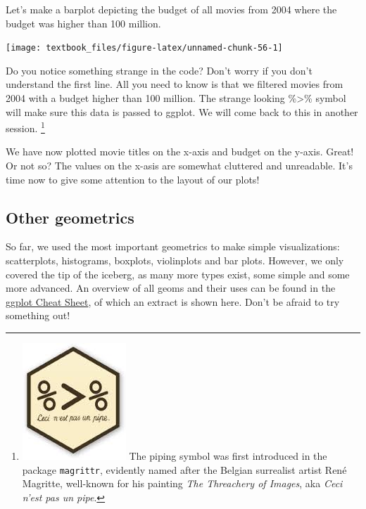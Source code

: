 \documentclass[]{tufte-book}
\newenvironment{Shaded}{}{}
\newcommand{\DecValTok}[1]{\textcolor[rgb]{0.25,0.63,0.44}{#1}}
\newcommand{\KeywordTok}[1]{\textcolor[rgb]{0.00,0.44,0.13}{\textbf{#1}}}
\newcommand{\NormalTok}[1]{#1}
\newcommand{\OperatorTok}[1]{\textcolor[rgb]{0.40,0.40,0.40}{#1}}
\newcommand{\StringTok}[1]{\textcolor[rgb]{0.25,0.44,0.63}{#1}}
\begin{document}
Let's make a barplot depicting the budget of all movies from 2004 where the budget was higher than 100 million.

\begin{Shaded}
\end{Shaded}

\texttt{[image: textbook\_files/figure-latex/unnamed-chunk-56-1]}

Do you notice something strange in the code? Don't worry if you don't understand the first line. All you need to know is that we filtered movies from 2004 with a budget higher than 100 million. The strange looking \%\textgreater\% symbol will make sure this data is passed to ggplot. We will come back to this in another session. \footnote{\includegraphics{images/pipe.jpg} The piping symbol was first introduced in the package \texttt{magrittr}, evidently named after the Belgian surrealist artist René Magritte, well-known for his painting \emph{The Threachery of Images}, aka \emph{Ceci n'est pas un pipe}.}

We have now plotted movie titles on the x-axis and budget on the y-axis. Great! Or not so? The values on the x-asis are somewhat cluttered and unreadable. It's time now to give some attention to the layout of our plots!

\hypertarget{other-geometrics}{%
\subsection{Other geometrics}\label{other-geometrics}}

So far, we used the most important geometrics to make simple visualizations: scatterplots, histograms, boxplots, violinplots and bar plots. However, we only covered the tip of the iceberg, as many more types exist, some simple and some more advanced. An overview of all geoms and their uses can be found in the \href{https://www.rstudio.com/wp-content/uploads/2015/12/ggplot2-cheatsheet-2.0.pdf}{ggplot Cheat Sheet}, of which an extract is shown here. Don't be afraid to try something out!
\end{document}
